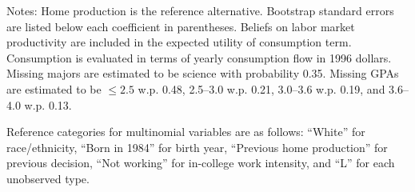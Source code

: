 \begin{landscape}
\begin{ThreePartTable}
\begin{TableNotes}
\item[ ] Notes: Home production is the reference alternative. Bootstrap standard errors are listed below each coefficient in parentheses. Beliefs on labor market productivity are included in the expected utility of consumption term. Consumption is evaluated in terms of yearly consumption flow in 1996 dollars.  Missing majors are estimated to be science with probability 0.35. Missing GPAs are estimated to be $\leq2.5$ w.p. 0.48, 2.5--3.0 w.p. 0.21, 3.0--3.6 w.p. 0.19, and 3.6--4.0 w.p. 0.13. 

\medskip

Reference categories for multinomial variables are as follows: ``White'' for race/ethnicity, ``Born in 1984'' for birth year, ``Previous home production'' for previous decision, ``Not working'' for in-college work intensity, and ``L'' for each unobserved type.
\end{TableNotes}


\end{ThreePartTable}
\end{landscape}
